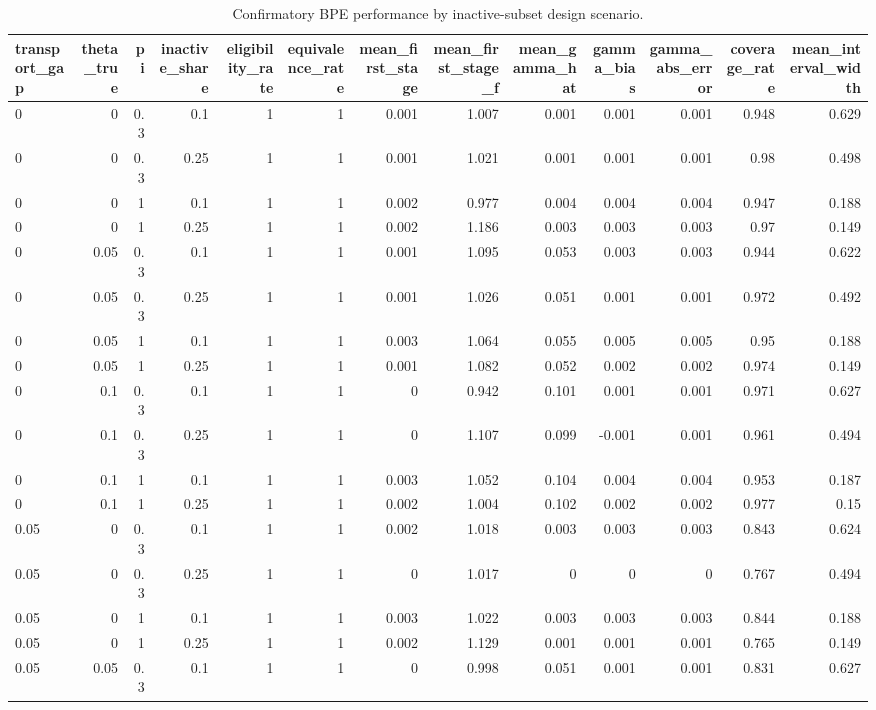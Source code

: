 \begin{table}[!htbp]
\centering
\caption{Confirmatory BPE performance by inactive-subset design scenario.}
\label{tab:bpe-design-performance}
\begin{tabular}{lrrrrrrrrrrrr}
\hline
transport\_gap & theta\_true & pi & inactive\_share & eligibility\_rate & equivalence\_rate & mean\_first\_stage & mean\_first\_stage\_f & mean\_gamma\_hat & gamma\_bias & gamma\_abs\_error & coverage\_rate & mean\_interval\_width
\\
\hline
0 & 0 & 0.3 & 0.1 & 1 & 1 & 0.001 & 1.007 & 0.001 & 0.001 & 0.001 & 0.948 & 0.629 \\
0 & 0 & 0.3 & 0.25 & 1 & 1 & 0.001 & 1.021 & 0.001 & 0.001 & 0.001 & 0.98 & 0.498 \\
0 & 0 & 1 & 0.1 & 1 & 1 & 0.002 & 0.977 & 0.004 & 0.004 & 0.004 & 0.947 & 0.188 \\
0 & 0 & 1 & 0.25 & 1 & 1 & 0.002 & 1.186 & 0.003 & 0.003 & 0.003 & 0.97 & 0.149 \\
0 & 0.05 & 0.3 & 0.1 & 1 & 1 & 0.001 & 1.095 & 0.053 & 0.003 & 0.003 & 0.944 & 0.622 \\
0 & 0.05 & 0.3 & 0.25 & 1 & 1 & 0.001 & 1.026 & 0.051 & 0.001 & 0.001 & 0.972 & 0.492 \\
0 & 0.05 & 1 & 0.1 & 1 & 1 & 0.003 & 1.064 & 0.055 & 0.005 & 0.005 & 0.95 & 0.188 \\
0 & 0.05 & 1 & 0.25 & 1 & 1 & 0.001 & 1.082 & 0.052 & 0.002 & 0.002 & 0.974 & 0.149 \\
0 & 0.1 & 0.3 & 0.1 & 1 & 1 & 0 & 0.942 & 0.101 & 0.001 & 0.001 & 0.971 & 0.627 \\
0 & 0.1 & 0.3 & 0.25 & 1 & 1 & 0 & 1.107 & 0.099 & -0.001 & 0.001 & 0.961 & 0.494 \\
0 & 0.1 & 1 & 0.1 & 1 & 1 & 0.003 & 1.052 & 0.104 & 0.004 & 0.004 & 0.953 & 0.187 \\
0 & 0.1 & 1 & 0.25 & 1 & 1 & 0.002 & 1.004 & 0.102 & 0.002 & 0.002 & 0.977 & 0.15 \\
0.05 & 0 & 0.3 & 0.1 & 1 & 1 & 0.002 & 1.018 & 0.003 & 0.003 & 0.003 & 0.843 & 0.624 \\
0.05 & 0 & 0.3 & 0.25 & 1 & 1 & 0 & 1.017 & 0 & 0 & 0 & 0.767 & 0.494 \\
0.05 & 0 & 1 & 0.1 & 1 & 1 & 0.003 & 1.022 & 0.003 & 0.003 & 0.003 & 0.844 & 0.188 \\
0.05 & 0 & 1 & 0.25 & 1 & 1 & 0.002 & 1.129 & 0.001 & 0.001 & 0.001 & 0.765 & 0.149 \\
0.05 & 0.05 & 0.3 & 0.1 & 1 & 1 & 0 & 0.998 & 0.051 & 0.001 & 0.001 & 0.831 & 0.627 \\

\end{tabular}
\end{table}
